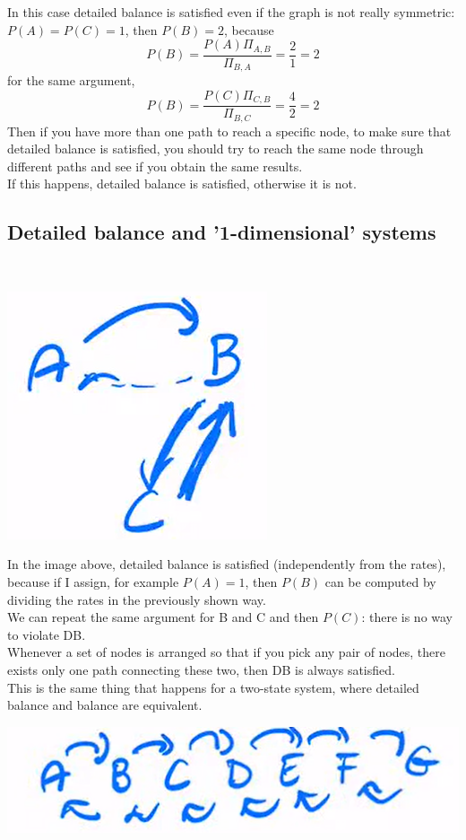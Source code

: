 In this case detailed balance is satisfied even if the graph is not really symmetric: $P(A)=P(C)=1$, then $P(B) = 2$, because
\[
P(B)=\frac{P(A)\Pi_{A,B}}{\Pi_{B,A}} = \frac{2}{1}=2
\]
for the same argument,
\[
P(B)=\frac{P(C)\Pi_{C,B}}{\Pi_{B,C}} = \frac{4}{2}=2
\]
Then if you have more than one path to reach a specific node, to make sure that detailed balance is satisfied, you should try to reach the same node through different paths and see if you obtain the same results.\\
If this happens, detailed balance is satisfied, otherwise it is not.\\
\subsection{Detailed balance and '1-dimensional' systems}\
\begin{center}\includegraphics[scale=0.5]{Monte Carlo/images/lect2/img4}\end{center}
In the image above, detailed balance is satisfied (independently from the rates), because if I assign, for example $P(A)=1$, then $P(B)$ can be computed by dividing the rates in the previously shown way.\\
We can repeat the same argument for B and C and then $P(C)$: there is no way to violate DB.\\
Whenever a set of nodes is arranged so that if you pick any pair of nodes, there exists only one path connecting these two, then DB is always satisfied.\\
This is the same thing that happens for a two-state system, where detailed balance and balance are equivalent.\\
\begin{center}\includegraphics[scale=0.5]{Monte Carlo/images/lect2/img5}\end{center}
